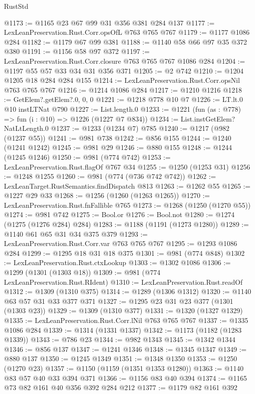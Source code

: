 \begin{lexlean}{RustStd}
\begin{coremodule}
@1173 := @1165 @23 @67 @99 @31 @356 @381 @284 @137
@1177 := LexLeanPreservation.Rust.Corr.opsOfL @763 @765 @767
@1179 := @1177 @1086 @284
@1182 := @1179 @67 @99 @381
@1188 := @1140 @58 @66 @97 @35 @372 @380
@1191 := @1156 @58 @97 @372
@1197 := LexLeanPreservation.Rust.Corr.closure @763 @765 @767 @1086 @284
@1204 := @1197 @55 @57 @33 @34 @31 @356 @371
@1205 := @2 @742
@1210 := @1204 @1205 @18 @284 @284 @155
@1214 := LexLeanPreservation.Rust.Corr.opsNil @763 @765 @767
@1216 := @1214 @1086 @284
@1217 := @1210 @1216
@1218 := GetElem?.getElem?.{0, 0, 0}
@1221 := @1218 @778 @10 @7
@1226 := LT.lt.{0} @10 instLTNat @790
@1227 := List.length.{0}
@1233 := @1221 (fun (as : @778) => fun (i : @10) => @1226 (@1227 @7 @834))
@1234 := List.instGetElem?NatLtLength.{0}
@1237 := @1233 (@1234 @7) @785
@1240 := @1217 (@982 (@1237 @55))
@1241 := @981 @738
@1242 := @856 @155
@1244 := @1240 (@1241 @1242)
@1245 := @981 @29
@1246 := @880 @155
@1248 := @1244 (@1245 @1246)
@1250 := @981 (@774 @742)
@1253 := LexLeanPreservation.Rust.flagOf @767 @34
@1255 := @1250 (@1253 @31)
@1256 := @1248 @1255
@1260 := @981 (@774 (@736 @742 @742))
@1262 := LexLeanTarget.RustSemantics.findDispatch @813
@1263 := @1262 @55
@1265 := @1227 @29 @33
@1268 := @1256 (@1260 (@1263 @1265))
@1270 := LexLeanPreservation.Rust.fnFallible @765
@1273 := @1268 (@1250 (@1270 @55))
@1274 := @981 @742
@1275 := Bool.or
@1276 := Bool.not
@1280 := @1274 (@1275 (@1276 @284) @284)
@1283 := @1188 (@1191 (@1273 @1280))
@1289 := @1140 @61 @65 @31 @34 @375 @379
@1293 := LexLeanPreservation.Rust.Corr.var @763 @765 @767
@1295 := @1293 @1086 @284
@1299 := @1295 @18 @31 @18 @375
@1301 := @981 (@774 @848)
@1302 := LexLeanPreservation.Rust.ctxLookup
@1303 := @1302 @1086
@1306 := @1299 (@1301 (@1303 @18))
@1309 := @981 (@774 LexLeanPreservation.Rust.RIdent)
@1310 := LexLeanPreservation.Rust.readOf
@1312 := @1309 (@1310 @375)
@1314 := @1289 (@1306 @1312)
@1320 := @1140 @63 @57 @31 @33 @377 @371
@1327 := @1295 @23 @31 @23 @377 (@1301 (@1303 @23))
@1329 := @1309 (@1310 @377)
@1331 := @1320 (@1327 @1329)
@1335 := LexLeanPreservation.Rust.Corr.lNil @763 @765 @767
@1337 := @1335 @1086 @284
@1339 := @1314 (@1331 @1337)
@1342 := @1173 (@1182 (@1283 @1339))
@1343 := @786 @23
@1344 := @982 @1343
@1345 := @1342 @1344
@1346 := @856 @137
@1347 := @1241 @1346
@1348 := @1345 @1347
@1349 := @880 @137
@1350 := @1245 @1349
@1351 := @1348 @1350
@1353 := @1250 (@1270 @23)
@1357 := @1150 (@1159 (@1351 @1353 @1280))
@1363 := @1140 @83 @57 @40 @33 @394 @371
@1366 := @1156 @83 @40 @394
@1374 := @1165 @73 @82 @161 @40 @356 @392 @284 @212
@1377 := @1179 @82 @161 @392

\end{coremodule}
\end{lexlean}
